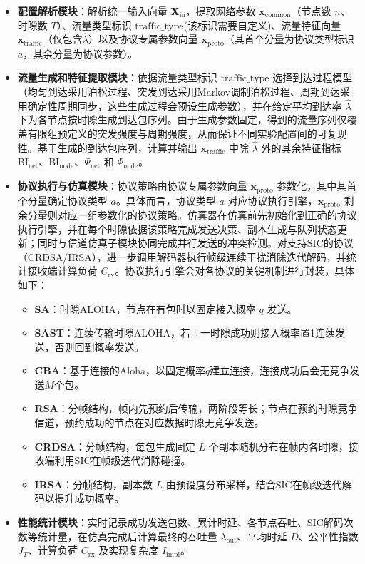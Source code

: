 \begin{itemize}[leftmargin=*]
	\item \textbf{配置解析模块}：解析统一输入向量 $\mathbf{X}_{\mathrm{in}}$，提取网络参数 $\mathbf{x}_{\text{common}}$（节点数 $n$、时隙数 $T$）、流量类型标识 $\text{traffic\_type}$(该标识需要自定义)、流量特征向量 $\mathbf{x}_{\text{traffic}}$（仅包含$\hat{\lambda}$）以及协议专属参数向量 $\mathbf{x}_{\mathrm{proto}}$（其首个分量为协议类型标识 $a$，其余分量为协议参数）。

	\item \textbf{流量生成和特征提取模块}：依据流量类型标识 $\text{traffic\_type}$ 选择到达过程模型（均匀到达采用泊松过程、突发到达采用Markov调制泊松过程、周期到达采用确定性周期同步，这些生成过程会预设生成参数），并在给定平均到达率 $\hat{\lambda}$ 下为各节点按时隙生成到达包序列。由于生成参数固定，得到的流量序列仅覆盖有限组预定义的突发强度与周期强度，从而保证不同实验配置间的可复现性。基于生成的到达包序列，计算并输出 $\mathbf{x}_{\text{traffic}}$ 中除 $\hat{\lambda}$ 外的其余特征指标 $\mathrm{BI}_{\mathrm{net}}$、$\mathrm{BI}_{\mathrm{node}}$、$\Psi_{\mathrm{net}}$ 和 $\Psi_{\mathrm{node}}$。

	\item \textbf{协议执行与仿真模块}：协议策略由协议专属参数向量 $\mathbf{x}_{\mathrm{proto}}$ 参数化，其中其首个分量确定协议类型 $a$。具体而言，协议类型 $a$ 对应协议执行引擎，$\mathbf{x}_{\mathrm{proto}}$ 剩余分量则对应一组参数化的协议策略。仿真器在仿真前先初始化到正确的协议执行引擎，并在每个时隙依据该策略完成发送决策、副本生成与队列状态更新；同时与信道仿真子模块协同完成并行发送的冲突检测。对支持SIC的协议（CRDSA/IRSA），进一步调用解码器执行帧级连续干扰消除迭代解码，并统计接收端计算负荷 $C_{\mathrm{rx}}$。协议执行引擎会对各协议的关键机制进行封装，具体如下：
	\begin{itemize}[leftmargin=*, itemsep=0.2em]
		\item \textbf{SA}：时隙ALOHA，节点在有包时以固定接入概率 $q$ 发送。
		\item \textbf{SAST}：连续传输时隙ALOHA，若上一时隙成功则接入概率置1连续发送，否则回到概率发送。
		\item \textbf{CBA}：基于连接的Aloha，以固定概率$q$建立连接，连接成功后会无竞争发送$M$个包。
		\item \textbf{RSA}：分帧结构，帧内先预约后传输，两阶段等长；节点在预约时隙竞争信道，预约成功的节点在对应数据时隙无竞争发送。
		\item \textbf{CRDSA}：分帧结构，每包生成固定 $L$ 个副本随机分布在帧内各时隙，接收端利用SIC在帧级迭代消除碰撞。
		\item \textbf{IRSA}：分帧结构，副本数 $L$ 由预设度分布采样，结合SIC在帧级迭代解码以提升成功概率。
	\end{itemize}

	\item \textbf{性能统计模块}：实时记录成功发送包数、累计时延、各节点吞吐、SIC解码次数等统计量，在仿真完成后计算最终的吞吐量 $\lambda_{\mathrm{out}}$、平均时延 $D$、公平性指数 $J_T$、计算负荷 $C_{\mathrm{rx}}$ 及实现复杂度 $I_{\mathrm{impl}}$。
\end{itemize}

